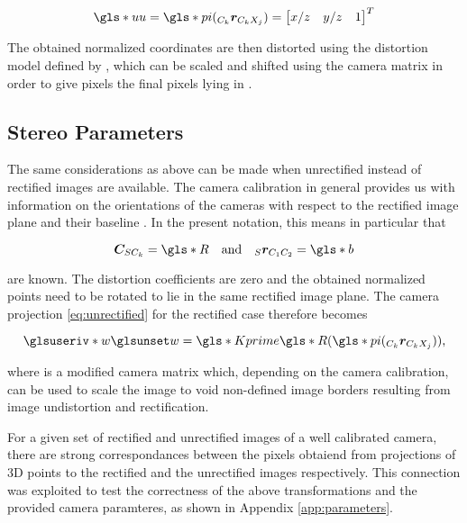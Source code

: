 \begin{equation}
  \g{uu} = \g{pi}(\crcx) = \rowvector{x/z & y/z & 1}^T
\end{equation}

The obtained normalized coordinates  are then distorted using the distortion model  defined by
\cite{radtan}, which can be scaled and shifted using the camera matrix  in order to
give pixels the final pixels  lying in .

\subsection{Stereo Parameters}

The same considerations as above can be made when unrectified instead of
rectified images are available. The camera calibration in general provides us
with information on the orientations of the cameras with respect to the
rectified image plane  and their baseline . \cite{DocCameraInfo}
\cite[p.  523f]{Siciliano2007}
In the present notation, this means in particular that 

\begin{equation}
  \rotsc = \g{R} \hspace{1em} \text{and} \hspace{1em} \srcc = \g{b} 
  \label{rect/eqn:assumptions}
\end{equation}

are known. The distortion coefficients  are zero and the obtained normalized
points need to be rotated to lie in the same rectified image plane. The camera projection
\ref{eq:unrectified} for the rectified case therefore becomes

\begin{equation*}
  \giv{w} = \g{Kprime}\g{R}(\g{pi}(\crcx)) \text{,}
\end{equation*}

where  is a modified camera matrix which, depending on the
camera calibration, can be used to scale the image to void non-defined
image borders resulting from image undistortion and rectification. 

For a given set of rectified and unrectified images of a well calibrated camera,
there are strong correspondances between the pixels obtaiend from projections of
3D points to the rectified and the unrectified images respectively. This
connection was exploited to test the correctness of the above transformations 
and the provided camera paramteres, as shown in Appendix \ref{app:parameters}.

